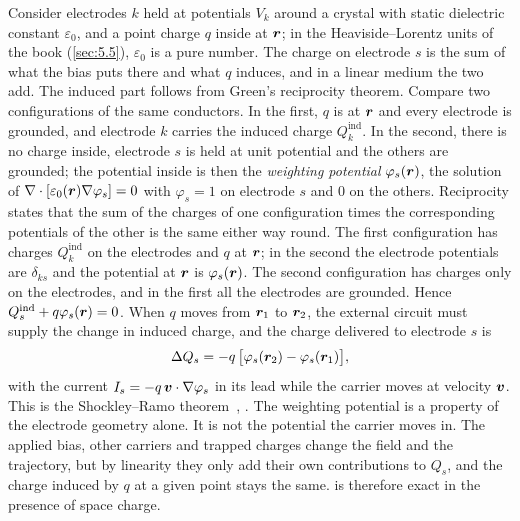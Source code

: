 Consider electrodes $k$ held at potentials $V_k$ around a crystal with static dielectric constant $\varepsilon_0$, and a point charge $q$ inside at $\bm{r}$; in the Heaviside--Lorentz units of the book (\cref{sec:5.5}), $\varepsilon_0$ is a pure number. The charge on electrode $s$ is the sum of what the bias puts there and what $q$ induces, and in a linear medium the two add. The induced part follows from Green's reciprocity theorem. Compare two configurations of the same conductors. In the first, $q$ is at $\bm{r}$ and every electrode is grounded, and electrode $k$ carries the induced charge $Q_k^{\mathrm{ind}}$. In the second, there is no charge inside, electrode $s$ is held at unit potential and the others are grounded; the potential inside is then the \emph{weighting potential} $\varphi_s(\bm{r})$, the solution of $\nabla\cdot[\varepsilon_0(\bm{r})\nabla\varphi_s] = 0$ with $\varphi_s = 1$ on electrode $s$ and 0 on the others. Reciprocity states that the sum of the charges of one configuration times the corresponding potentials of the other is the same either way round. The first configuration has charges $Q_k^{\mathrm{ind}}$ on the electrodes and $q$ at $\bm{r}$; in the second the electrode potentials are $\delta_{ks}$ and the potential at $\bm{r}$ is $\varphi_s(\bm{r})$. The second configuration has charges only on the electrodes, and in the first all the electrodes are grounded. Hence $Q_s^{\mathrm{ind}} + q\varphi_s(\bm{r}) = 0$. When $q$ moves from $\bm{r}_1$ to $\bm{r}_2$, the external circuit must supply the change in induced charge, and the charge delivered to electrode $s$ is
\begin{equation}
  \Delta Q_s = -q\,\bigl[\varphi_s(\bm{r}_2) - \varphi_s(\bm{r}_1)\bigr] ,
  \label{eq:20.1-ramo}
\end{equation}
with the current $I_s = -q\,\bm{v}\cdot\nabla\varphi_s$ in its lead while the carrier moves at velocity $\bm{v}$. This is the Shockley--Ramo theorem~\cite{shockley1938currents,ramo1939currents}, \cite[Eq.~(2)]{lachish2017electron}. The weighting potential is a property of the electrode geometry alone. It is not the potential the carrier moves in. The applied bias, other carriers and trapped charges change the field and the trajectory, but by linearity they only add their own contributions to $Q_s$, and the charge induced by $q$ at a given point stays the same.  is therefore exact in the presence of space charge.

